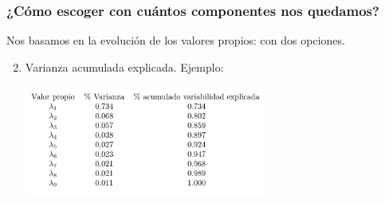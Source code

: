 \documentclass{beamer}
\begin{document}
\begin{frame}\frametitle{¿Cómo escoger con cuántos componentes nos quedamos?}
                \begin{overlayarea}{\textwidth}{8cm} 
  Nos basamos en la evolución de los valores propios: con dos opciones.

  \begin{enumerate}
      \setcounter{enumi}{1}
  \item<+-> Varianza acumulada explicada. Ejemplo:
  \begin{center}
    \includegraphics[width=8cm]{tabla-acp-crop.png}
  \end{center}

  \end{enumerate}
                \end{overlayarea}
  
\end{frame}
\end{document}
